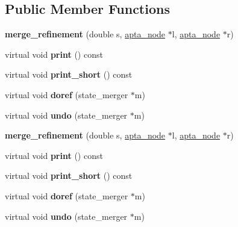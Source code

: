 \subsection*{Public Member Functions}
\begin{DoxyCompactItemize}
\item 
{\bfseries merge\+\_\+refinement} (double s, \hyperlink{classapta__node}{apta\+\_\+node} $\ast$l, \hyperlink{classapta__node}{apta\+\_\+node} $\ast$r)\hypertarget{classmerge__refinement_ab15fbbafe3f8f46af3642854c8369358}{}\label{classmerge__refinement_ab15fbbafe3f8f46af3642854c8369358}

\item 
virtual void {\bfseries print} () const \hypertarget{classmerge__refinement_ab2cefa02adc51cdb87a05e9d78b0c54a}{}\label{classmerge__refinement_ab2cefa02adc51cdb87a05e9d78b0c54a}

\item 
virtual void {\bfseries print\+\_\+short} () const \hypertarget{classmerge__refinement_a0c6074a732d5656f1fd87432c7c2b1de}{}\label{classmerge__refinement_a0c6074a732d5656f1fd87432c7c2b1de}

\item 
virtual void {\bfseries doref} (state\+\_\+merger $\ast$m)\hypertarget{classmerge__refinement_ad1b3a5fe3fa980978d909debf4eaebd1}{}\label{classmerge__refinement_ad1b3a5fe3fa980978d909debf4eaebd1}

\item 
virtual void {\bfseries undo} (state\+\_\+merger $\ast$m)\hypertarget{classmerge__refinement_ae5d7dcbd7ddc8595b2d7bcf88d14ad98}{}\label{classmerge__refinement_ae5d7dcbd7ddc8595b2d7bcf88d14ad98}

\item 
{\bfseries merge\+\_\+refinement} (double s, \hyperlink{classapta__node}{apta\+\_\+node} $\ast$l, \hyperlink{classapta__node}{apta\+\_\+node} $\ast$r)\hypertarget{classmerge__refinement_ab15fbbafe3f8f46af3642854c8369358}{}\label{classmerge__refinement_ab15fbbafe3f8f46af3642854c8369358}

\item 
virtual void {\bfseries print} () const \hypertarget{classmerge__refinement_a953914729ca33cc00487e2bde5005d0a}{}\label{classmerge__refinement_a953914729ca33cc00487e2bde5005d0a}

\item 
virtual void {\bfseries print\+\_\+short} () const \hypertarget{classmerge__refinement_a4baf6cb0eaf2af651fcd1c3bff723317}{}\label{classmerge__refinement_a4baf6cb0eaf2af651fcd1c3bff723317}

\item 
virtual void {\bfseries doref} (state\+\_\+merger $\ast$m)\hypertarget{classmerge__refinement_a9d086a6cf86ccf48572d0293e6b31f1b}{}\label{classmerge__refinement_a9d086a6cf86ccf48572d0293e6b31f1b}

\item 
virtual void {\bfseries undo} (state\+\_\+merger $\ast$m)\hypertarget{classmerge__refinement_a29caa18a89730e768f9e335b804f0749}{}\label{classmerge__refinement_a29caa18a89730e768f9e335b804f0749}

\end{DoxyCompactItemize}
